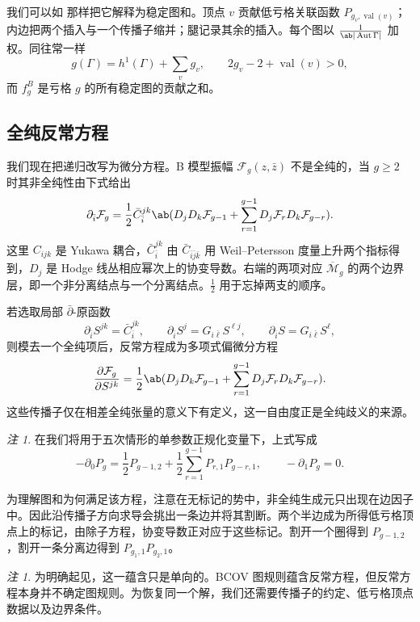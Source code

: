 \documentclass{amsart}
\theoremstyle{definition}
\theoremstyle{remark}
\newtheorem{rmk}[thm]{注}
\theoremstyle{plain}
\theoremstyle{definition}
\theoremstyle{remark}
\newcommand{\Mbar}{\overline{\mathcal{M}}}
\newcommand{\mc}[1]{\mathcal{#1}}
\newcommand{\on}[1]{\operatorname{#1}}
\newcommand{\1}{\mathbf{1}}
\newcommand{\2}{\mathbf{2}}
\newcommand{\3}{\mathbf{3}}
\DeclareMathOperator{\Aut}{Aut}
\begin{document}
我们可以如  那样把它解释为稳定图和。顶点 \(v\) 贡献低亏格关联函数 \(P_{g_v, \on{val}(v)}\)；内边把两个插入与一个传播子缩并；腿记录其余的插入。每个图以 \(\frac{1}{\ab|\Aut \Gamma|}\) 加权。同往常一样
\[ g(\Gamma) = h^1(\Gamma) + \sum_v g_v, \qquad 2g_v - 2 + \on{val}(v) > 0, \]
而 \(f_g^B\) 是亏格 \(g\) 的所有稳定图的贡献之和。

\subsection{全纯反常方程}%
\label{sub:The holomorphic anomaly equation}

我们现在把递归改写为微分方程。B 模型振幅 \(\mc{F}_g(z,\bar{z})\) 不是全纯的，当 \(g \geq 2\) 时其非全纯性由下式给出
\[ \partial_{\bar{i}} \mc{F}_g = \frac{1}{2}\bar{C}_{\bar{i}}^{jk}\ab( D_j D_k \mc{F}_{g-1} + \sum_{r=1}^{g-1} D_j \mc{F}_r D_k \mc{F}_{g-r} ). \]
这里 \(C_{ijk}\) 是 Yukawa 耦合，\(\bar{C}_{\bar{i}}^{jk}\) 由 \(\bar{C}_{\bar{i}\bar{j}\bar{k}}\) 用 Weil–Petersson 度量上升两个指标得到，\(D_j\) 是 Hodge 线丛相应幂次上的协变导数。右端的两项对应 \(\Mbar_g\) 的两个边界层，即一个非分离结点与一个分离结点。\(\frac{1}{2}\) 用于忘掉两支的顺序。

若选取局部 \(\bar{\partial}\)-原函数
\[ \partial_{\bar{i}}S^{jk} = \bar{C}_{\bar{i}}^{jk}, \qquad \partial_{\bar{i}}S^j = G_{i\bar{\ell}}S^{\ell j}, \qquad \partial_{\bar{i}}S = G_{i\bar{\ell}}S^{\ell}, \]
则模去一个全纯项后，反常方程成为多项式偏微分方程
\[ \pdv{\mc{F}_g}{S^{jk}} = \frac{1}{2}\ab( D_jD_k \mc{F}_{g-1} + \sum_{r=1}^{g-1} D_j \mc{F}_r D_k \mc{F}_{g-r} ). \]
这些传播子仅在相差全纯张量的意义下有定义，这一自由度正是全纯歧义的来源。

\begin{rmk}
    在我们将用于五次情形的单参数正规化变量下，上式写成
    \[ -\partial_0 P_g = \frac{1}{2}P_{g-1,2} + \frac{1}{2}\sum_{r=1}^{g-1}P_{r,1}P_{g-r,1}, \qquad -\partial_1 P_g = 0. \]
\end{rmk}

为理解图和为何满足该方程，注意在无标记的势中，非全纯生成元只出现在边因子中。因此沿传播子方向求导会挑出一条边并将其割断。两个半边成为所得低亏格顶点上的标记，由除子方程，协变导数正对应于这些标记。割开一个圈得到 \(P_{g-1,2}\)，割开一条分离边得到 \(P_{g_1,1}P_{g_2,1}\)。

\begin{rmk}
    为明确起见，这一蕴含只是单向的。BCOV 图规则蕴含反常方程，但反常方程本身并不确定图规则。为恢复同一个解，我们还需要传播子的约定、低亏格顶点数据以及边界条件。
\end{rmk}
\end{document}
